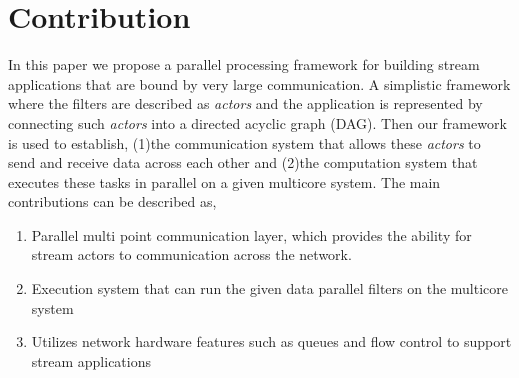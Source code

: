 \documentclass[10pt, conference, compsocconf, reqno]{IEEEtran}
\newcommand{\comment}[1]{}
\begin{document}
\section{Contribution}

In this paper we propose a parallel processing framework for building stream applications that are bound by very large communication. A simplistic framework where the filters are described as \textit{actors} and the application is represented by connecting such \textit{actors} into a directed acyclic graph (DAG). Then our framework is used to establish, (1)the communication system that allows these \textit{actors} to send and receive data across each other and (2)the computation system that executes these tasks in parallel on a given multicore system. The main contributions can be described as,

\begin{enumerate}
\item Parallel multi point communication layer, which provides the ability for stream actors to communication across the network.
\item Execution system that can run the given data parallel filters on the multicore system
\item Utilizes network hardware features such as queues and flow control to support stream applications

\end{enumerate}

\comment{
We focus on integrating the packet processing and application tasks into a single graph and using this to extract data parallelism. The developer describes their program as a graph of \textit{filters}. Each actor consumes one or more \textit{tokens} of data, which may be simple data such as integers, or more complex data such as packets, arrays, or objects and produces one or more tokens. The framework can be used to automatically map the application over multiple parallel cores, and interface with the \texttt{netmap} APIs \cite{Rizzo:2012:RNI:2090147.2103536} for accessing data through the network buffers.

The system can be divided into three main parts:

\begin{itemize}
\item A subsystem for interfacing with the network hardware through the \texttt{netmap} APIs to send and receive data from the application in user space without going through the operating system. (Section \ref{ppio})
\item Given a graph that represents the workload to be performed by the application, we construct and integrate the packet processing operations represented as a directed acyclic graph (DAG) to it. (Section \ref{ppe})
\item A run-time system that executes these tasks in parallel and explicitly schedules them on the multicore processor. (Section \ref{ppt})
\end{itemize}
}
\end{document}
